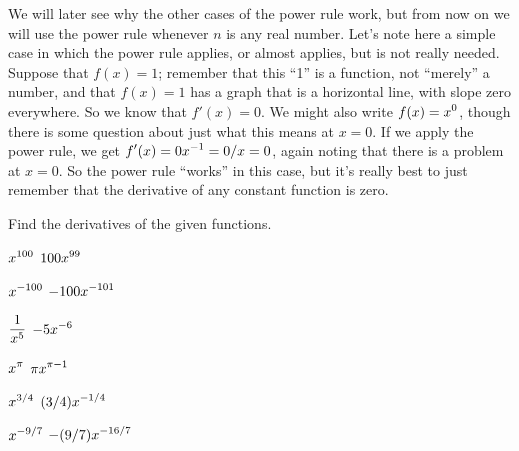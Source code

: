 We will later see why the other cases of the power rule work, but from
now on we will use the power rule whenever $n$ is any real number.
Let's note here a simple case in which the power rule applies, or
almost applies, but is not really needed. Suppose that $f(x)=1$;
remember that this ``1'' is a function, not ``merely'' a number, and
that $f(x)=1$ has a graph that is a horizontal line, with slope zero
everywhere. So we know that $f'(x)=0$. We might also write $\displaystyle f(x)=x^0$,
though there is some question about just what this means at $x=0$. If
we apply the power rule, we get $\displaystyle f'(x)=0x^{-1}=0/x=0$, again noting
that there is a problem at $x=0$. So the power rule ``works'' in this
case, but it's really best to just remember that the derivative of any
constant function is zero.

\exercises

Find the derivatives of the given functions.

\twocol

\exercise $\displaystyle x^{100}$
\answer $\displaystyle 100x^{99}$
\endanswer
\endexercise

\exercise $\displaystyle x^{-100}$
\answer $\displaystyle -100x^{-101}$
\endanswer
\endexercise

\exercise $\displaystyle {1\over x^5}$
\answer $\displaystyle -5x^{-6}$
\endanswer
\endexercise

\exercise $\displaystyle x^\pi$
\answer $\displaystyle \pi x^{\pi-1}$
\endanswer
\endexercise

\exercise $\displaystyle x^{3/4}$
\answer $\displaystyle (3/4)x^{-1/4}$
\endanswer
\endexercise

\exercise $\displaystyle x^{-9/7}$
\answer $\displaystyle -(9/7)x^{-16/7}$
\endanswer

\endtwocol
\endexercise

\endexercises
